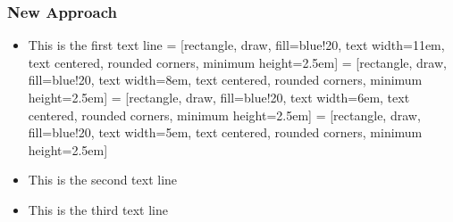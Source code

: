 \documentclass{beamer}
\begin{document}
\begin{frame}
\frametitle{\large{New Approach}}
\small
\begin{itemize}\addtolength{\itemsep}{1.4\baselineskip}
\item This is the first text line
\pause
{} = [rectangle, draw, fill=blue!20, text width=11em, text centered, rounded corners, minimum height=2.5em]
 = [rectangle, draw, fill=blue!20, text width=8em, text centered, rounded corners, minimum height=2.5em]
 = [rectangle, draw, fill=blue!20, text width=6em, text centered, rounded corners, minimum height=2.5em]
 = [rectangle, draw, fill=blue!20, text width=5em, text centered, rounded corners, minimum height=2.5em]
\bigskip
\bigskip
\begin{figure}
\begin{center}
\vspace*{-0.2in}
\tiny{
}
\end{center}
\end{figure}
\item<7-> This is the second text line
\item<8> This is the third text line
\end{itemize}
\end{frame}
\end{document}
